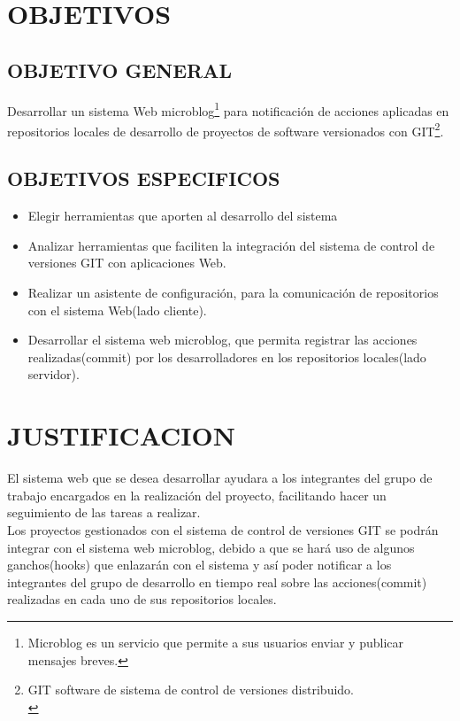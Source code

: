 \section{OBJETIVOS}
\subsection{OBJETIVO GENERAL}
Desarrollar un sistema Web microblog\footnote{Microblog es un servicio que permite a sus usuarios enviar y publicar mensajes breves.
} para notificación de acciones aplicadas en repositorios locales de desarrollo de proyectos de software versionados con GIT\footnote{GIT software de sistema de control de versiones distribuido.\\
}.

\subsection{OBJETIVOS ESPECIFICOS}
\begin{itemize}
\item Elegir herramientas que aporten al desarrollo del sistema
\item Analizar herramientas que faciliten la integración del sistema de control de versiones GIT con aplicaciones Web.
\item Realizar un asistente de configuración, para la comunicación de 	repositorios con el sistema Web(lado cliente).
\item Desarrollar el sistema web microblog, que permita registrar las acciones realizadas(commit) por los desarrolladores en los repositorios locales(lado servidor).
\end{itemize}

\section{JUSTIFICACION}
El sistema web que se desea desarrollar ayudara  a los integrantes del grupo de trabajo encargados en la realización del proyecto, facilitando hacer un seguimiento de las tareas a realizar.\\

Los proyectos gestionados con el sistema de control de versiones GIT se podrán integrar con el sistema web microblog, debido a que se hará uso de algunos ganchos(hooks) que enlazarán con el sistema y así poder notificar a los integrantes del grupo de desarrollo en tiempo real sobre las acciones(commit) realizadas en cada uno de sus repositorios locales.\\

